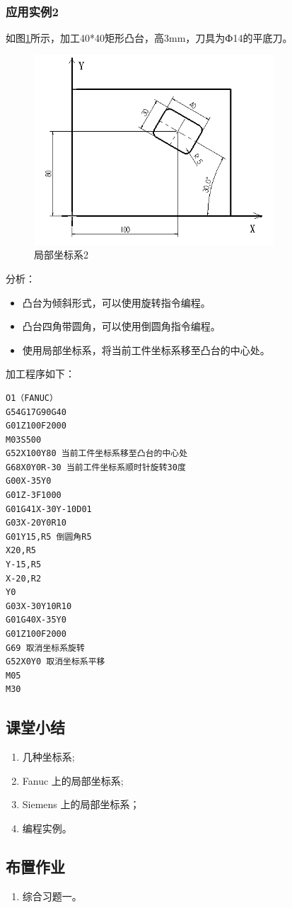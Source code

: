 \subsubsection{应用实例2}
如图\ref{局部坐标系2}所示，加工40*40矩形凸台，高3mm，刀具为Ф14的平底刀。
\begin{figure}
	\centering	\includegraphics[width=0.8\textwidth]{images/6-2}
	\caption{局部坐标系2} \label{局部坐标系2}
\end{figure}

分析：
\begin{itemize}
\item 凸台为倾斜形式，可以使用旋转指令编程。
\item 凸台四角带圆角，可以使用倒圆角指令编程。
\item 使用局部坐标系，将当前工件坐标系移至凸台的中心处。
\end{itemize}
加工程序如下：
\begin{verbatim}
O1（FANUC）
G54G17G90G40
G01Z100F2000
M03S500
G52X100Y80 当前工件坐标系移至凸台的中心处
G68X0Y0R-30 当前工件坐标系顺时针旋转30度
G00X-35Y0
G01Z-3F1000            
G01G41X-30Y-10D01
G03X-20Y0R10
G01Y15,R5 倒圆角R5
X20,R5
Y-15,R5
X-20,R2
Y0
G03X-30Y10R10
G01G40X-35Y0
G01Z100F2000
G69 取消坐标系旋转
G52X0Y0 取消坐标系平移
M05
M30
\end{verbatim}



\subsection{课堂小结}
\begin{enumerate}[1、]
	\item 几种坐标系;
	\item Fanuc 上的局部坐标系;
	\item Siemens 上的局部坐标系；
	\item 编程实例。
\end{enumerate}

\vfill
\subsection{布置作业}
\begin{enumerate}[1、]
	\item 综合习题一。 
\end{enumerate}
\vfill